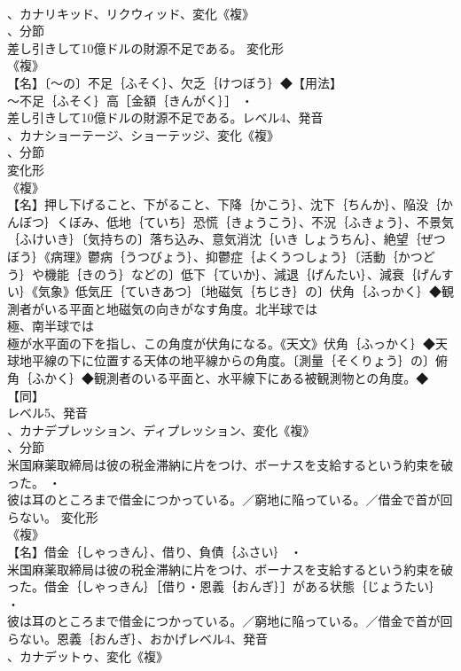 \documentclass[8pt]{extreport}
\begin{document}
\begin{CJK}{UTF8}{min}
\\	、カナリキッド、リクウィッド、変化《複》
\\	、分節
\\	差し引きして10億ドルの財源不足である。	変化形 
\\	《複》
\\	【名】〔～の〕不足｛ふそく｝、欠乏｛けつぼう｝◆【用法】
\\	～不足｛ふそく｝高［金額｛きんがく｝］ ・
\\	差し引きして10億ドルの財源不足である。レベル4、発音
\\	、カナショーテージ、ショーテッジ、変化《複》
\\	、分節
\\	変化形 
\\	《複》
\\	【名】押し下げること、下がること、下降｛かこう｝、沈下｛ちんか｝、陥没｛かんぼつ｝くぼみ、低地｛ていち｝恐慌｛きょうこう｝、不況｛ふきょう｝、不景気｛ふけいき｝〔気持ちの〕落ち込み、意気消沈｛いき しょうちん｝、絶望｛ぜつぼう｝《病理》鬱病｛うつびょう｝、抑鬱症｛よくうつしょう｝〔活動｛かつどう｝や機能｛きのう｝などの〕低下｛ていか｝、減退｛げんたい｝、減衰｛げんすい｝《気象》低気圧｛ていきあつ｝〔地磁気｛ちじき｝の〕伏角｛ふっかく｝◆観測者がいる平面と地磁気の向きがなす角度。北半球では
\\	極、南半球では
\\	極が水平面の下を指し、この角度が伏角になる。《天文》伏角｛ふっかく｝◆天球地平線の下に位置する天体の地平線からの角度。〔測量｛そくりょう｝の〕俯角｛ふかく｝◆観測者のいる平面と、水平線下にある被観測物との角度。◆【同】
\\	レベル5、発音
\\	、カナデプレッション、ディプレッション、変化《複》
\\	、分節
\\	米国麻薬取締局は彼の税金滞納に片をつけ、ボーナスを支給するという約束を破った。 ・
\\	彼は耳のところまで借金につかっている。／窮地に陥っている。／借金で首が回らない。	変化形 
\\	《複》
\\	【名】借金｛しゃっきん｝、借り、負債｛ふさい｝ ・
\\	米国麻薬取締局は彼の税金滞納に片をつけ、ボーナスを支給するという約束を破った。借金｛しゃっきん｝［借り・恩義｛おんぎ｝］がある状態｛じょうたい｝ ・
\\	彼は耳のところまで借金につかっている。／窮地に陥っている。／借金で首が回らない。恩義｛おんぎ｝、おかげレベル4、発音
\\	、カナデットゥ、変化《複》

\end{CJK}
\end{document}
